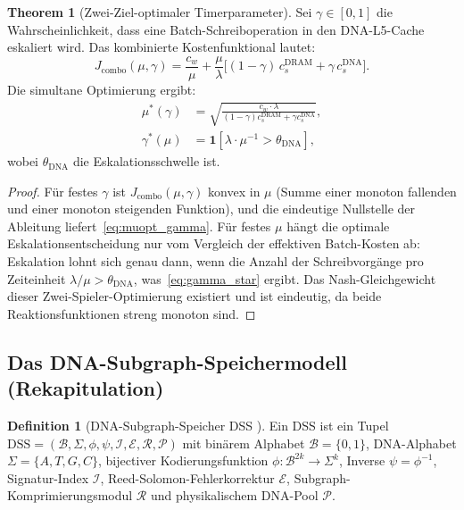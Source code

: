﻿\documentclass[a4paper,12pt]{article}
\theoremstyle{definition}
\newtheorem{definition}{Definition}[section]
\newtheorem{theorem}{Theorem}[section]
\begin{document}
\begin{theorem}[Zwei-Ziel-optimaler Timerparameter]
  \label{thm:twotarget}
  Sei $\gamma \in [0,1]$ die Wahrscheinlichkeit, dass eine Batch-Schreiboperation
  in den DNA-L5-Cache eskaliert wird. Das kombinierte Kostenfunktional lautet:
  \begin{equation}
    J_{\mathrm{combo}}(\mu, \gamma) = \frac{c_w}{\mu}
    + \frac{\mu}{\lambda}\bigl[(1-\gamma)\,c_s^{\mathrm{DRAM}} + \gamma\,c_s^{\mathrm{DNA}}\bigr].
    \label{eq:combo_cost}
  \end{equation}
  Die simultane Optimierung ergibt:
  \begin{align}
    \mu^*(\gamma) &= \sqrt{\frac{c_w \cdot \lambda}{(1-\gamma) c_s^{\mathrm{DRAM}} + \gamma c_s^{\mathrm{DNA}}}},
    \label{eq:muopt_gamma} \\
    \gamma^*(\mu) &= \mathbf{1}\!\left[\lambda \cdot \mu^{-1} > \theta_{\mathrm{DNA}}\right],
    \label{eq:gamma_star}
  \end{align}
  wobei $\theta_{\mathrm{DNA}}$ die Eskalationsschwelle ist.
\end{theorem}

\begin{proof}
  Für festes $\gamma$ ist $J_{\mathrm{combo}}(\mu, \gamma)$ konvex in $\mu$
  (Summe einer monoton fallenden und einer monoton steigenden Funktion),
  und die eindeutige Nullstelle der Ableitung liefert~\eqref{eq:muopt_gamma}.
  Für festes $\mu$ hängt die optimale Eskalationsentscheidung nur vom
  Vergleich der effektiven Batch-Kosten ab: Eskalation lohnt sich genau dann,
  wenn die Anzahl der Schreibvorgänge pro Zeiteinheit
  $\lambda / \mu > \theta_{\mathrm{DNA}}$, was~\eqref{eq:gamma_star} ergibt.
  Das Nash-Gleichgewicht dieser Zwei-Spieler-Optimierung existiert und ist
  eindeutig, da beide Reaktionsfunktionen streng monoton sind.
\end{proof}

\subsection{Das DNA-Subgraph-Speichermodell (Rekapitulation)}

\begin{definition}[DNA-Subgraph-Speicher DSS \cite{epp2026dnastor}]
  \label{def:dss}
  Ein DSS ist ein Tupel
  $\mathrm{DSS} = (\mathcal{B}, \Sigma, \phi, \psi, \mathcal{I}, \mathcal{E}, \mathcal{R}, \mathcal{P})$
  mit binärem Alphabet $\mathcal{B}=\{0,1\}$, DNA-Alphabet $\Sigma=\{A,T,G,C\}$,
  bijectiver Kodierungsfunktion $\phi: \mathcal{B}^{2k} \to \Sigma^k$,
  Inverse $\psi = \phi^{-1}$, Signatur-Index $\mathcal{I}$,
  Reed-Solomon-Fehlerkorrektur $\mathcal{E}$, Subgraph-Komprimierungsmodul $\mathcal{R}$
  und physikalischem DNA-Pool $\mathcal{P}$.
\end{definition}
\end{document}
